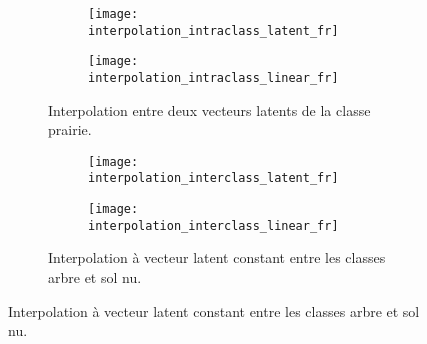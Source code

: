 \begin{figure}[ht]
\begin{subfigure}{\textwidth}
	\begin{subfigure}{0.5\textwidth}
		\texttt{[image: interpolation\_intraclass\_latent\_fr]}
	\end{subfigure}
	\begin{subfigure}{0.5\textwidth}
		\texttt{[image: interpolation\_intraclass\_linear\_fr]}
	\end{subfigure}
	\caption{Interpolation entre deux vecteurs latents de la classe prairie.}
	\label{fig:interpolation_intra}
\end{subfigure}

\begin{subfigure}{\textwidth}
	\begin{subfigure}{0.5\textwidth}
		\texttt{[image: interpolation\_interclass\_latent\_fr]}
	\end{subfigure}
	\begin{subfigure}{0.5\textwidth}
		\texttt{[image: interpolation\_interclass\_linear\_fr]}
	\end{subfigure}
	\caption{Interpolation à vecteur latent constant entre les classes arbre et sol nu.}
	\label{fig:interpolation_inter}
\end{subfigure}

\label{fig:interpolation}
\end{figure}

